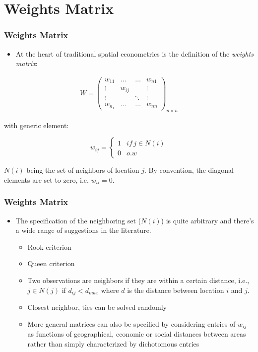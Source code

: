 \documentclass[
  shownotes,
  xcolor={svgnames},
  hyperref={colorlinks,citecolor=DarkBlue,linkcolor=DarkRed,urlcolor=DarkBlue}
  ]{beamer}
\begin{document}
\section{Weights Matrix}
\begin{frame}[fragile]
\frametitle{Weights Matrix}

\begin{itemize}
  \item At the heart of traditional spatial econometrics is the definition of the {\it weights matrix}:
\end{itemize}


\begin{align}
W=\left(\begin{array}{cccc}
w_{11} & \dots & \dots & w_{n1}\\
\vdots & w_{ij} &  & \vdots\\
\vdots &  & \ddots & \vdots\\
w_{n_{1}} & \dots & \dots & w_{nn}
\end{array}\right)_{n\times n}
\end{align}

with generic element:

\begin{equation}
w_{ij}=\begin{cases}
1 & if\,j\in N\left(i\right)\\
0 & o.w
\end{cases}
\end{equation}

$N(i)$ being the set of neighbors of location $j$. By convention, the diagonal elements are set to zero, i.e. $w_{ii}=0$. 

\end{frame}
\begin{frame}[fragile]
\frametitle{Weights Matrix}



\begin{itemize}
\item The specification of  the neighboring set ($N(i)$) is quite arbitrary and there's a wide range of suggestions in the literature. 
\bigskip
  \begin{itemize}
    \item Rook criterion
    \medskip
    \item Queen criterion
    \medskip
    \item Two observations are neighbors if they are within a certain distance, i.e., $j\in N(j)$ if $d_{ij} < d_{max}$ where $d$ is the distance between location $i$ and $j$. 
    \medskip
    \item Closest neighbor, ties can be solved randomly
    \medskip
    \item More general matrices can also be specified by considering entries of $w_{ij}$ as functions of geographical, economic or social distances between areas rather than simply characterized by dichotomous entries 
  \end{itemize}
\end{itemize}


\end{frame}
\end{document}
